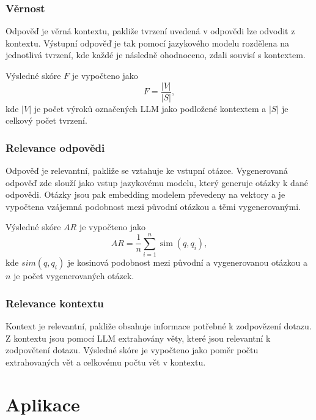 \subsubsection{Věrnost}
Odpověď je věrná kontextu, pakliže tvrzení uvedená v odpovědi lze odvodit z kontextu. Výstupní odpověď je tak pomocí jazykového modelu rozdělena na jednotlivá tvrzení, kde každé je následně ohodnoceno, zdali souvisí s kontextem.

Výsledné skóre $F$ je vypočteno jako
\begin{equation}
    F = \frac{|V|}{|S|}, 
\end{equation}
kde $|V|$ je počet výroků označených LLM jako podložené kontextem a $|S|$ je celkový počet tvrzení.

\subsubsection{Relevance odpovědi}
Odpověď je relevantní, pakliže se vztahuje ke vstupní otázce. Vygenerovaná odpověď zde slouží jako vstup jazykovému modelu, který generuje otázky k dané odpovědi. Otázky jsou pak embedding modelem převedeny na vektory a je vypočtena vzájemná podobnost mezi původní otázkou a těmi vygenerovanými.

Výsledné skóre $AR$ je vypočteno jako 
\begin{equation}
    AR = \frac{1}{n} \sum_{i=1}^{n} \operatorname{sim}(q, q_i),
\end{equation}
kde $sim(q, q_i)$ je kosinová podobnost mezi původní a vygenerovanou otázkou a $n$ je počet vygenerovaných otázek.


\subsubsection{Relevance kontextu}
Kontext je relevantní, pakliže obsahuje informace potřebné k zodpovězení dotazu. Z kontextu jsou pomocí LLM extrahovány věty, které jsou relevantní k zodpovětení dotazu. Výsledné skóre je vypočteno jako poměr počtu extrahovaných vět a celkovému počtu vět v kontextu.

\section{Aplikace}


